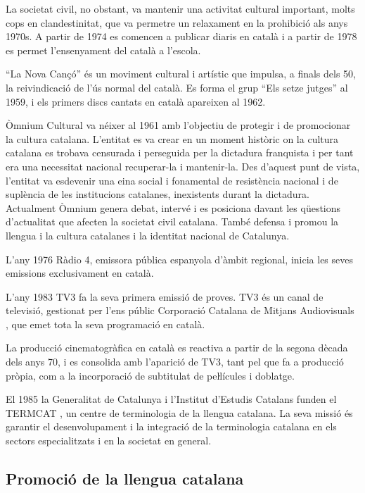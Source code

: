 \documentclass[]{../../metanetpaper}
\begin{document}
\begin{multicols}{2}
La societat civil, no obstant, va mantenir una activitat cultural important, molts cops en clandestinitat, que va permetre un relaxament en la prohibició als anys 1970s. A partir de 1974 es comencen a publicar diaris en català i a partir de 1978 es permet l’ensenyament del català a l’escola.

 “La Nova Cançó” és un moviment cultural i artístic que impulsa, a finals dels 50, la reivindicació de l’ús normal del català. Es forma el grup “Els setze jutges” al 1959, i els primers discs cantats en català apareixen al 1962.

Òmnium Cultural \cite{CAT-omniumcultural} va néixer al 1961 amb l’objectiu de protegir i de promocionar la cultura catalana. L’entitat es va crear en un moment històric on la cultura catalana es trobava censurada i perseguida per la dictadura franquista i per tant era una necessitat nacional recuperar-la i mantenir-la. Des d’aquest punt de vista, l’entitat va esdevenir una eina social i fonamental de resistència nacional i de suplència de les institucions catalanes, inexistents durant la dictadura. Actualment Òmnium genera debat, intervé i es posiciona davant les qüestions d’actualitat que afecten la societat civil catalana. També defensa i promou la llengua i la cultura catalanes i la identitat nacional de Catalunya.

L’any 1976 Ràdio 4, emissora pública espanyola d’àmbit regional, inicia les seves emissions exclusivament en català.

L’any 1983 TV3 fa la seva primera emissió de proves. TV3 és un canal de televisió, gestionat per l’ens públic Corporació Catalana de Mitjans Audiovisuals \cite{CAT-CCMA}, que emet tota la seva programació en català.

La producció cinematogràfica en català es reactiva a partir de la segona dècada dels anys 70, i es consolida amb l’aparició de TV3, tant pel que fa a producció pròpia, com a la incorporació de subtitulat de peŀlícules i doblatge.

El 1985 la Generalitat de Catalunya i l’Institut d’Estudis Catalans funden el TERMCAT \cite{CAT-TERMCAT}, un centre de terminologia de la llengua catalana. La seva missió és garantir el desenvolupament i la integració de la terminologia catalana en els sectors especialitzats i en la societat en general.

\subsection{Promoció de la llengua catalana}


\end{multicols}
\end{document}
